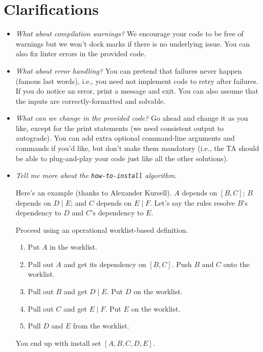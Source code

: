 \documentclass[12pt]{article}
\renewcommand{\_}{\kern-1.5pt\textunderscore\kern-1.5pt}
\begin{document}
\section*{Clarifications}
\begin{itemize}
\item \emph{What about compilation warnings?} We encourage your code to be free of warnings but we won't dock marks if there is no underlying issue. You can also fix linter errors in the provided code.
\item \emph{What about error handling?} You can pretend that failures never happen (famous last words), i.e., you need not implement code to retry after failures. If you do notice an error, print a message and exit. You can also assume that the inputs are correctly-formatted and solvable.
  \item \emph{What can we change in the provided code?} Go ahead and change it as you like, except for the print statements (we need consistent output to autograde). You can add extra optional command-line arguments and commands if you'd like, but don't make them mandatory (i.e., the TA should be able to plug-and-play your code just like all the other solutions). 
\item \emph{Tell me more about the \texttt{how-to-install} algorithm.}

\vspace{1em} Here's an example (thanks to Alexander Kursell). $A$ depends on $[B, C]$; $B$ depends on $D \mid E$; and $C$ depends on $E \mid F$. Let's say the rules resolve $B$'s dependency to $D$ and $C$'s dependency to $E$.

\vspace{1em} Proceed using an operational worklist-based definition. 
\begin{enumerate}[noitemsep]
\item Put $A$ in the worklist.
\item Pull out $A$ and get its dependency on $[B, C]$. Push $B$ and $C$ onto the worklist.
\item Pull out $B$ and get $D \mid E$. Put $D$ on the worklist.
\item Pull out $C$ and get $E \mid F$. Put $E$ on the worklist.
\item Pull $D$ and $E$ from the worklist.
\end{enumerate}
You end up with install set $[A, B, C, D, E]$.


\end{itemize}
\end{document}
